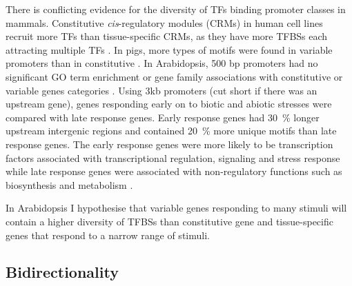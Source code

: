 \documentclass[../main.tex]{subfiles}
\begin{document}
There is conflicting evidence for the diversity of TFs binding promoter classes in mammals.
Constitutive \textit{cis}\hyp{}regulatory modules (CRMs) in human cell lines recruit more TFs than tissue-specific CRMs, as they have more TFBSs each attracting multiple TFs \autocite{mattioliHighthroughputFunctionalAnalysis2019}.
In pigs, more types of motifs were found in variable promoters than in constitutive \autocite{weiCharacterizationGenePromoters2019}.
In Arabidopsis, 500 bp promoters had no significant GO term enrichment or gene family associations with constitutive or variable genes categories \autocite{waltherRegulatoryCodeTranscriptional2007}.
Using 3kb promoters (cut short if there was an upstream gene), genes responding early on to biotic and abiotic stresses were compared with late response genes.
Early response genes had \SI{30}{\percent} longer upstream intergenic regions and contained \SI{20}{\percent} more unique motifs than late response genes.
The early response genes were more likely to be transcription factors associated with transcriptional regulation, signaling and stress response while late response genes were associated with non-regulatory functions such as biosynthesis and metabolism {\autocite{waltherRegulatoryCodeTranscriptional2007}}.

In Arabidopsis I hypothesise that variable genes responding to many stimuli will contain a higher diversity of TFBSs than constitutive gene and tissue-specific genes that respond to a narrow range of stimuli.

\subsection{Bidirectionality}
\end{document}
